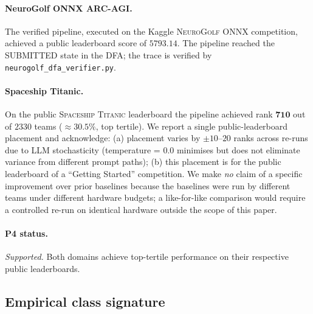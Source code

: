 \paragraph{NeuroGolf ONNX ARC-AGI.}
The verified pipeline, executed on the Kaggle
\textsc{NeuroGolf ONNX} competition, achieved a public leaderboard
score of $\mathbf{5793.14}$.  The pipeline reached the
\textsf{SUBMITTED} state in the DFA; the trace is verified by
\texttt{neurogolf\_dfa\_verifier.py}.

\paragraph{Spaceship Titanic.}
On the public \textsc{Spaceship Titanic} leaderboard the pipeline
achieved rank $\mathbf{710}$ out of $2330$ teams
($\approx\!30.5\%$, top tertile).  We report a single
public-leaderboard placement and acknowledge: (a) placement varies
by $\pm 10$--$20$ ranks across re-runs due to LLM stochasticity
(temperature = 0.0 minimises but does not eliminate variance from
different prompt paths); (b) this placement is for the public
leaderboard of a ``Getting Started'' competition.  We make
\emph{no} claim of a specific improvement over prior baselines
because the baselines were run by different teams under different
hardware budgets; a like-for-like comparison would require a
controlled re-run on identical hardware outside the scope of this
paper.

\paragraph{P4 status.}  \emph{Supported.}
Both domains achieve top-tertile performance on their respective
public leaderboards.

\subsection{Empirical class signature}

